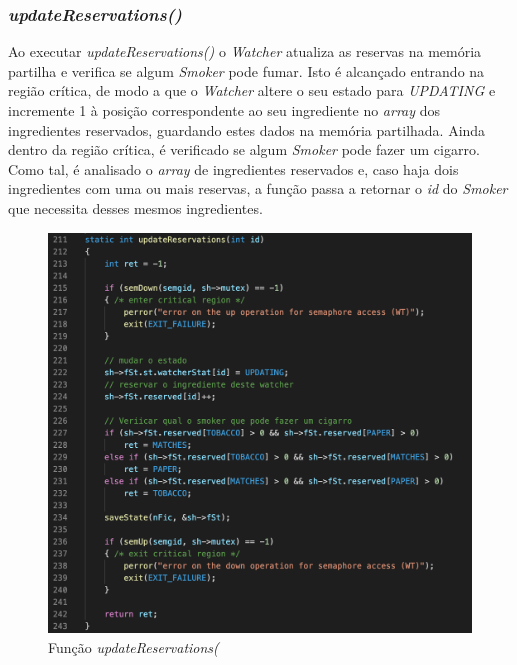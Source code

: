 \documentclass[10pt,portuguese]{article}
\begin{document}
\clearpage

\subsubsection{\textit{updateReservations()}}

\par Ao executar \textit{updateReservations()} o \textit{Watcher} atualiza as reservas na memória partilha e verifica se algum \textit{Smoker} pode fumar. Isto é alcançado entrando na região crítica, de modo a que o \textit{Watcher} altere o seu estado para \textit{UPDATING} e incremente 1 à posição correspondente ao seu ingrediente no \textit{array} dos ingredientes reservados, guardando estes dados na memória partilhada. Ainda dentro da região crítica, é verificado se algum \textit{Smoker} pode fazer um cigarro. Como tal, é analisado o \textit{array} de ingredientes reservados e, caso haja dois ingredientes com uma ou mais reservas, a função passa a retornar o \textit{id} do \textit{Smoker} que necessita desses mesmos ingredientes.

\begin{figure}[!h]
    \centering
    \includegraphics[width=\textwidth]{images/implementation/updateres.png}
    \caption{Função \textit{updateReservations(}}
\end{figure}

\clearpage
\end{document}
